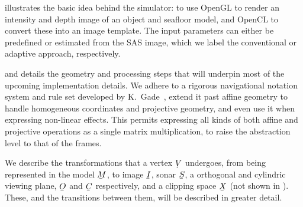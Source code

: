  illustrates the basic idea behind the simulator: to use OpenGL to render an intensity and depth image of an object and seafloor model, and OpenCL to convert these into an image template. The input parameters can either be predefined or estimated from the SAS image, which we label the conventional or adaptive approach, respectively.

 and  details the geometry and processing steps that will underpin most of the upcoming implementation details. We adhere to a rigorous navigational notation system and rule set developed by K.~Gade~\cite{Gade2018}, extend it past affine geometry to handle homogeneous coordinates and projective geometry, and even use it when expressing non-linear effects. This permits expressing all kinds of both affine and projective operations as a single matrix multiplication, to raise the abstraction level to that of the frames.

We describe the transformations that a vertex $\udot{V}$ undergoes, from being represented in the model $\ubar{M}$, to  image $\ubar{I}$, sonar $\ubar{S}$, a orthogonal and cylindric viewing plane, $\ubar{O}$ and $\ubar{C}$ respectively, and a clipping space $\ubar{X}$ (not shown in ).   These, and the transitions between them, will be described in greater detail.


